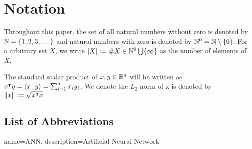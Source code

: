 \chapter*{Notation}
\label{c:Notation}

Throughout this paper, the set of all natural numbers without zero is denoted by
$\mathbb{N} = \{1,2,3,\dots\}$ and natural numbers with zero is denoted by $\mathbb{N}^0 =
\mathbb{N} \setminus \{0\}$. For a arbitrary set $X$, we write $\left| X \right| := \# X \in
\mathbb{N}^0 \bigcup \{\infty\}$ as the number of elements of $X$.

The standard scalar product of $x,y\in\mathbb{R}^d$ will be written as $x{}^{\intercal} y =
\left\langle x\, , y \right\rangle = \sum_{i=1}^d x_iy_i$. We denote the $L_2$ norm of x is denoted by
$\left\| x \right\| := \sqrt{x{}^{\intercal} x}$

\section*{List of Abbreviations}

\printglossary

{
    name=ANN,
    description={Artificial Neural Network}
}





